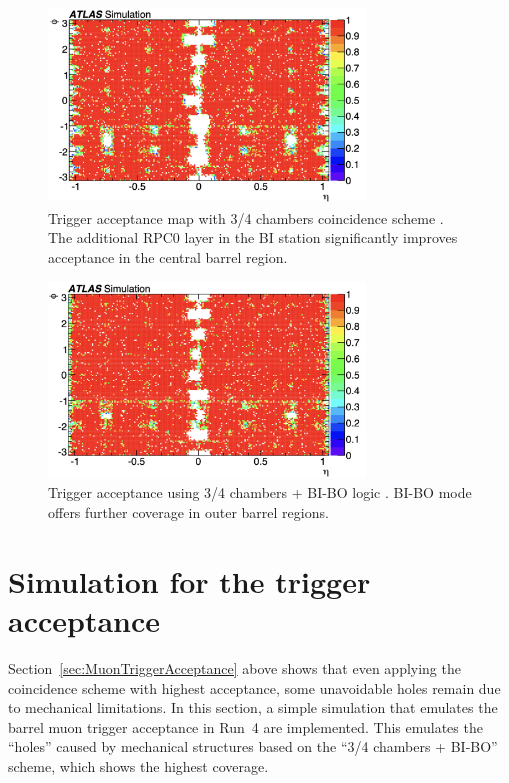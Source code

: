 \begin{figure}[htbp]
  \centering
  \includegraphics[width=0.75\textwidth]{figs/chapter4/trigger_acceptance_map_3_4.png}
  \caption{Trigger acceptance map with 3/4 chambers coincidence scheme \cite{TDAQ_TDR}. The additional RPC0 layer in the BI station significantly improves acceptance in the central barrel region.}
  \label{fig:trigger_acceptance_3_4}
\end{figure}

\begin{figure}[htbp]
  \centering
  \includegraphics[width=0.75\textwidth]{figs/chapter4/trigger_acceptance_map_3_4_BI_BO.png}
  \caption{Trigger acceptance using 3/4 chambers + BI-BO logic \cite{TDAQ_TDR}. BI-BO mode offers further coverage in outer barrel regions.}
  \label{fig:trigger_acceptance_3_4_BI_BO}
\end{figure}
\section{Simulation for the trigger acceptance} 
Section~\ref{sec:MuonTriggerAcceptance} above shows that even applying the coincidence scheme with highest acceptance, some unavoidable holes remain due to mechanical limitations. In this section, a simple simulation that emulates the barrel muon trigger acceptance in Run~4 are implemented. This emulates the ``holes'' caused by mechanical structures based on the ``3/4 chambers + BI-BO'' scheme, which shows the highest coverage.

